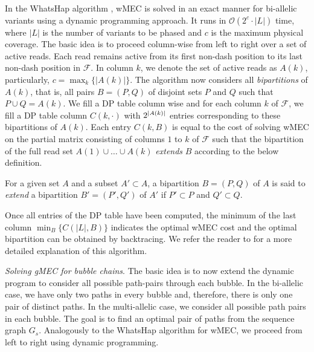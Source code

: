 In the WhatsHap algorithm \citep{Patterson2015}, wMEC is solved in an exact manner for bi-allelic variants using a dynamic programming approach.
It runs in $\mathcal{O}(2^c\cdot |L|)$ time, where $|L|$ is the number of variants to be phased and $c$ is the maximum physical coverage.
The basic idea is to proceed column-wise from left to right over a set of active reads.
Each read remains active from its first non-dash position to its last non-dash position in $\mathcal{F}$.
In column $k$, we denote the set of active reads as $A(k)$, particularly, $c=\max_{k}\{|A(k)|\}$.
The algorithm now considers all \emph{bipartitions} of $A(k)$, that is, all pairs $B=(P,Q)$ of disjoint sets $P$ and $Q$ such that $P\cup Q=A(k)$.
We fill a DP table column wise and for each column $k$ of $\mathcal{F}$, we fill a DP table column $C(k,\cdot)$ with $2^{\left\lvert A(k) \right\rvert}$ entries corresponding to these bipartitions of $A(k)$.
Each entry $C(k,B)$ is equal to the cost of solving wMEC on the partial matrix consisting of columns $1$ to $k$ of $\mathcal{F}$ such that the bipartition of the full read set $A(1)\cup\ldots\cup A(k)$ \emph{extends} $B$ according to the below definition.
\begin{definition}
For a given set $A$ and a subset $A'\subset A$, a bipartition $B=(P,Q)$ of $A$ is said to \emph{extend} a bipartition $B'=(P',Q')$ of $A'$ if $P'\subset P$ and $Q'\subset Q$.
\end{definition}

Once all entries of the DP table have been computed, the minimum of the last column $\min_B\{C(|L|,B)\}$ indicates the optimal wMEC cost and the optimal bipartition can be obtained by backtracing.
We refer the reader to \cite{Patterson2015} for a more detailed explanation of this algorithm.

\textit{Solving gMEC for bubble chains}. The basic idea is to now extend the dynamic program to consider all possible path-pairs through each bubble. 
In the bi-allelic case, we have only two paths in every bubble and, therefore, there is only one pair of distinct paths.
In the multi-allelic case, we consider all possible path pairs in each bubble.
The goal is to find an optimal pair of paths from the sequence graph $G_s$.
Analogously to the WhatsHap algorithm for wMEC, we proceed from left to right using dynamic programming.  

